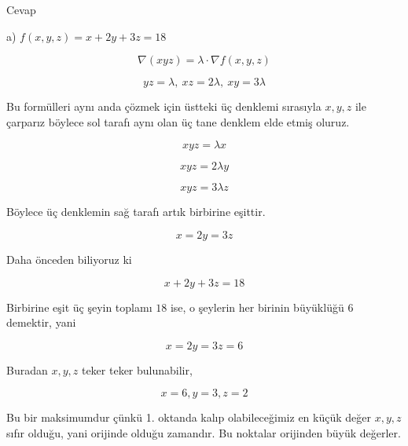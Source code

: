 \documentclass[12pt,fleqn]{article}\usepackage{../../common}
\begin{document}
Cevap

a) $f(x,y,z) = x + 2y + 3z = 18$

$$ \nabla (xyz) = \lambda \cdot \nabla f(x,y,z) $$

$$ yz = \lambda, \ xz = 2\lambda, \ xy = 3\lambda $$

Bu formülleri aynı anda çözmek için üstteki üç denklemi sırasıyla $x,y,z$
ile çarparız böylece sol tarafı aynı olan üç tane denklem elde etmiş
oluruz. 

$$ xyz = \lambda x $$

$$ xyz = 2 \lambda y $$

$$ xyz = 3 \lambda z $$

Böylece üç denklemin sağ tarafı artık birbirine eşittir. 

$$ x = 2y = 3z $$

Daha önceden biliyoruz ki

$$ x + 2y + 3z = 18 $$

Birbirine eşit üç şeyin toplamı $18$ ise, o şeylerin her birinin büyüklüğü
$6$ demektir, yani 

$$ x = 2y = 3z = 6$$

Buradan $x,y,z$ teker teker bulunabilir,

$$ x = 6, y=3, z= 2 $$

Bu bir maksimumdur çünkü 1. oktanda kalıp olabileceğimiz en küçük değer
$x,y,z$ sıfır olduğu, yani orijinde olduğu zamandır. Bu noktalar orijinden
büyük değerler. 
\end{document}
